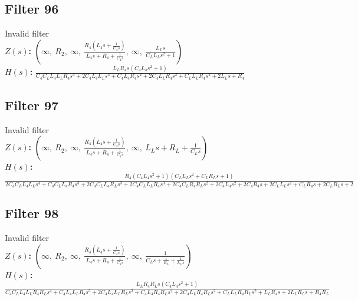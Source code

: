 \documentclass{article}
\begin{document}
\subsection*{Filter 96}
Invalid filter \\ 
\textbf{$Z(s)$:} $\left( \infty, \  R_{2}, \  \infty, \  \frac{R_{4} \left(L_{4} s + \frac{1}{C_{4} s}\right)}{L_{4} s + R_{4} + \frac{1}{C_{4} s}}, \  \infty, \  \frac{L_{L} s}{C_{L} L_{L} s^{2} + 1}\right)$ \\ 
\textbf{$H(s)$:} $\frac{L_{L} R_{4} s \left(C_{4} L_{4} s^{2} + 1\right)}{C_{4} C_{L} L_{4} L_{L} R_{4} s^{4} + 2 C_{4} L_{4} L_{L} s^{3} + C_{4} L_{4} R_{4} s^{2} + 2 C_{4} L_{L} R_{4} s^{2} + C_{L} L_{L} R_{4} s^{2} + 2 L_{L} s + R_{4}}$ \\ 
\subsection*{Filter 97}
Invalid filter \\ 
\textbf{$Z(s)$:} $\left( \infty, \  R_{2}, \  \infty, \  \frac{R_{4} \left(L_{4} s + \frac{1}{C_{4} s}\right)}{L_{4} s + R_{4} + \frac{1}{C_{4} s}}, \  \infty, \  L_{L} s + R_{L} + \frac{1}{C_{L} s}\right)$ \\ 
\textbf{$H(s)$:} $\frac{R_{4} \left(C_{4} L_{4} s^{2} + 1\right) \left(C_{L} L_{L} s^{2} + C_{L} R_{L} s + 1\right)}{2 C_{4} C_{L} L_{4} L_{L} s^{4} + C_{4} C_{L} L_{4} R_{4} s^{3} + 2 C_{4} C_{L} L_{4} R_{L} s^{3} + 2 C_{4} C_{L} L_{L} R_{4} s^{3} + 2 C_{4} C_{L} R_{4} R_{L} s^{2} + 2 C_{4} L_{4} s^{2} + 2 C_{4} R_{4} s + 2 C_{L} L_{L} s^{2} + C_{L} R_{4} s + 2 C_{L} R_{L} s + 2}$ \\ 
\subsection*{Filter 98}
Invalid filter \\ 
\textbf{$Z(s)$:} $\left( \infty, \  R_{2}, \  \infty, \  \frac{R_{4} \left(L_{4} s + \frac{1}{C_{4} s}\right)}{L_{4} s + R_{4} + \frac{1}{C_{4} s}}, \  \infty, \  \frac{1}{C_{L} s + \frac{1}{R_{L}} + \frac{1}{L_{L} s}}\right)$ \\ 
\textbf{$H(s)$:} $\frac{L_{L} R_{4} R_{L} s \left(C_{4} L_{4} s^{2} + 1\right)}{C_{4} C_{L} L_{4} L_{L} R_{4} R_{L} s^{4} + C_{4} L_{4} L_{L} R_{4} s^{3} + 2 C_{4} L_{4} L_{L} R_{L} s^{3} + C_{4} L_{4} R_{4} R_{L} s^{2} + 2 C_{4} L_{L} R_{4} R_{L} s^{2} + C_{L} L_{L} R_{4} R_{L} s^{2} + L_{L} R_{4} s + 2 L_{L} R_{L} s + R_{4} R_{L}}$ \\ 
\end{document}
